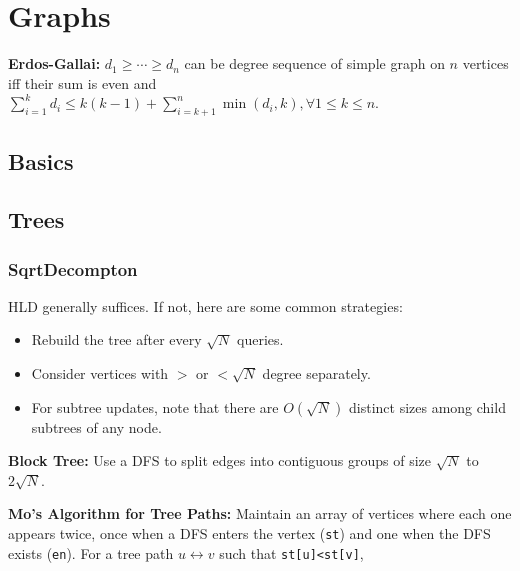 \chapter{Graphs}

\textbf{Erdos-Gallai:} $d_1\geq\cdots\geq d_n$ can be degree sequence of simple graph on $n$ vertices iff their sum is even and $\sum_{i=1}^{k}d_{i}\leq k(k-1)+\sum _{i=k+1}^{n}\min(d_{i},k), \forall 1\le k\le n.$

\section{Basics}
	
	\section{Trees}

	\subsection{SqrtDecompton}

		HLD generally suffices. If not, here are some common strategies:
		
		\begin{itemize}
			\item Rebuild the tree after every $\sqrt N$ queries. %
			\item Consider vertices with $>$ or $<\sqrt N$ degree separately. %
			\item For subtree updates, note that there are $O(\sqrt N)$ distinct sizes among child subtrees of any node.
		\end{itemize}

		\textbf{Block Tree:} Use a DFS to split edges into contiguous groups of size $\sqrt N$ to $2\sqrt N.$

		\textbf{Mo's Algorithm for Tree Paths:} Maintain an array of vertices where each one appears twice, once when a DFS enters the vertex (\texttt{st}) and one when the DFS exists (\texttt{en}). For a tree path $u\leftrightarrow v$ such that \texttt{st[u]<st[v]},

